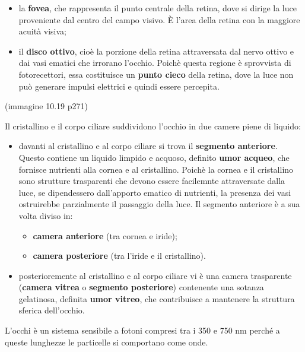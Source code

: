 \documentclass[]{article}
\begin{document}
\begin{itemize}
  \begin{itemize}
  \itemsep1pt\parskip0pt
  \item
    la \textbf{fovea}, che rappresenta il punto centrale della retina,
    dove si dirige la luce proveniente dal centro del campo visivo. È
    l'area della retina con la maggiore acuità visiva;
  \item
    il \textbf{disco ottivo}, cioè la porzione della retina attraversata
    dal nervo ottivo e dai vasi ematici che irrorano l'occhio. Poichè
    questa regione è sprovvista di fotorecettori, essa costituisce un
    \textbf{punto cieco} della retina, dove la luce non può generare
    impulsi elettrici e quindi essere percepita.
  \end{itemize}
\end{itemize}

(immagine 10.19 p271)

Il cristallino e il corpo ciliare suddividono l'occhio in due camere
piene di liquido:

\begin{itemize}
\itemsep1pt\parskip0pt
\item
  davanti al cristallino e al corpo ciliare si trova il \textbf{segmento
  anteriore}. Questo contiene un liquido limpido e acquoso, definito
  \textbf{umor acqueo}, che fornisce nutrienti alla cornea e al
  cristallino. Poichè la cornea e il cristallino sono strutture
  trasparenti che devono essere facilemnte attraversate dalla luce, se
  dipendessero dall'apporto ematico di nutrienti, la presenza dei vasi
  ostruirebbe parzialmente il passaggio della luce. Il segmento
  anteriore è a sua volta diviso in:

  \begin{itemize}
  \itemsep1pt\parskip0pt
  \item
    \textbf{camera anteriore} (tra cornea e iride);
  \item
    \textbf{camera posteriore} (tra l'iride e il cristallino).
  \end{itemize}
\item
  posterioremente al cristallino e al corpo ciliare vi è una camera
  trasparente (\textbf{camera vitrea} o \textbf{segmento posteriore})
  contenente una sotanza gelatinosa, definita \textbf{umor vitreo}, che
  contribuisce a mantenere la struttura sferica dell'occhio.
\end{itemize}

L'occhi è un sistema sensibile a fotoni compresi tra i 350 e 750 nm
perché a queste lunghezze le particelle si comportano come onde.
\end{document}
